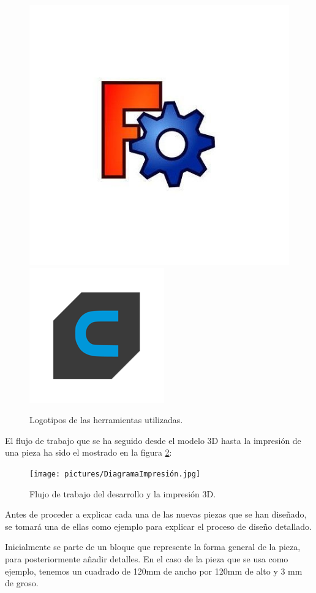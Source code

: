 \begin{figure}[H]
    \centering
    \includegraphics[width=.45\linewidth]{pictures/freeCAD.jpg}
    \hspace{1cm}
    \includegraphics[width=.40\linewidth]{pictures/Ultimaker_cura_logo.png}
    \caption{Logotipos de las herramientas utilizadas.}
    \label{fig:herramientas_3d}
\end{figure}

El flujo de trabajo que se ha seguido desde el modelo 3D hasta la impresión de una pieza ha sido el mostrado en la figura \ref{fig:flujo_3d}:

\begin{figure}[H]
    \centering
    \texttt{[image: pictures/DiagramaImpresión.jpg]}
    \caption{Flujo de trabajo del desarrollo y la impresión 3D.}
    \label{fig:flujo_3d}
\end{figure}

Antes de proceder a explicar cada una de las nuevas piezas que se han diseñado, se tomará una de ellas como ejemplo para explicar el proceso de diseño detallado.

Inicialmente se parte de un bloque que represente la forma general de la pieza, para posteriormente añadir detalles. En el caso de la pieza que se usa como ejemplo, tenemos un cuadrado de 120mm de ancho por 120mm de alto y 3 mm de groso.

